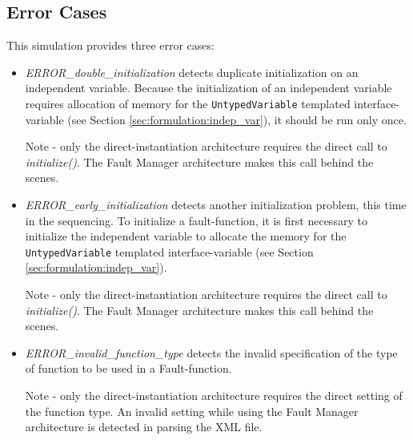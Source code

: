 \documentclass[11pt,fleqn]{report}
\begin{document}
\subsection{Error Cases}
This simulation provides three error cases:
\begin{itemize}
  \item \textit{ERROR\_double\_initialization} detects duplicate initialization
        on an independent variable. Because the initialization of an independent
        variable requires allocation of memory for the \verb'UntypedVariable'
        templated interface-variable (see Section
        \ref{sec:formulation:indep_var}), it should be run only once.

        Note -  only the direct-instantiation architecture requires the direct
        call to \textit{initialize()}.  The Fault Manager architecture makes
        this call behind the scenes.
  \item \textit{ERROR\_early\_initialization} detects another initialization
        problem, this time in the sequencing. To initialize a fault-function, it
        is first necessary to initialize the independent variable to allocate
        the memory for the \verb'UntypedVariable' templated interface-variable
        (see Section \ref{sec:formulation:indep_var}).

        Note -  only the direct-instantiation architecture requires the direct
        call to \textit{initialize()}.  The Fault Manager architecture makes
        this call behind the scenes.
  \item \textit{ERROR\_invalid\_function\_type} detects the invalid
        specification of the type of function to be used in a Fault-function.

        Note -  only the direct-instantiation architecture requires the direct
        setting of the function type. An invalid setting while using the Fault
        Manager architecture is detected in parsing the XML file.
\end{itemize}
\end{document}
